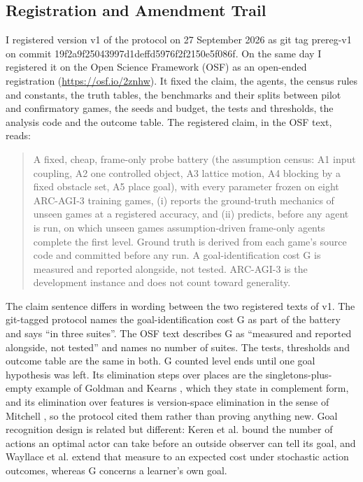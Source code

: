\documentclass[twocolumn]{svjour3}
\begin{document}
\subsection{Registration and Amendment Trail}\label{sec:registration}

I registered version v1 of the protocol on 27 September 2026 as git tag
prereg-v1 on commit
19f2a9f2\allowbreak{}5043997d\allowbreak{}1deffd59\allowbreak{}76f2f215\allowbreak{}0e5f086f.
On the same day I registered it on the Open Science Framework (OSF) as
an open-ended registration (\url{https://osf.io/2znhw}). It fixed the
claim, the agents, the census rules and constants, the truth tables, the
benchmarks and their splits between pilot and confirmatory games, the
seeds and budget, the tests and thresholds, the analysis code and the
outcome table. The registered claim, in the OSF text, reads:

\begin{quote}
A fixed, cheap, frame-only probe battery (the assumption census: A1
input coupling, A2 one controlled object, A3 lattice motion, A4 blocking
by a fixed obstacle set, A5 place goal), with every parameter frozen on
eight ARC-AGI-3 training games, (i) reports the ground-truth mechanics
of unseen games at a registered accuracy, and (ii) predicts, before any
agent is run, on which unseen games assumption-driven frame-only agents
complete the first level. Ground truth is derived from each game's
source code and committed before any run. A goal-identification cost G
is measured and reported alongside, not tested. ARC-AGI-3 is the
development instance and does not count toward generality.
\end{quote}

The claim sentence differs in wording between the two registered texts
of v1. The git-tagged protocol names the goal-identification cost G as
part of the battery and says ``in three suites''. The OSF text describes
G as ``measured and reported alongside, not tested'' and names no number
of suites. The tests, thresholds and outcome table are the same in both.
G counted level ends until one goal hypothesis was left. Its elimination
steps over places are the singletons-plus-empty example of Goldman and
Kearns \citep{goldman1995teaching}, which they state in complement form,
and its elimination over features is version-space elimination in the
sense of Mitchell \citep{mitchell1982generalization}, so the protocol
cited them rather than proving anything new. Goal recognition design is
related but different: Keren et al. \citep{keren2014grd} bound the
number of actions an optimal actor can take before an outside observer
can tell its goal, and Wayllace et al. \citep{wayllace2016grd} extend
that measure to an expected cost under stochastic action outcomes,
whereas G concerns a learner's own goal.
\end{document}
